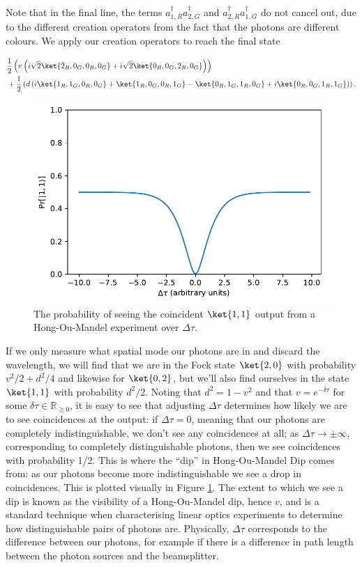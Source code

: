 Note that in the final line, the terms $a_{1,R}^\dagger a_{2,G}^\dagger$ and $a_{2,R}^\dagger a_{1,G}^\dagger$ do not cancel out, due to the different creation operators from the fact that the photons are different colours. We apply our creation operators to reach the final state

\begin{align}
&\frac{1}{2}\left(v\left(i\sqrt{2}\ket{2_R,0_G,0_R,0_G} +i\sqrt{2}\ket{0_R,0_G,2_R,0_G}\right)\right)\nonumber\\
&+\frac{1}{2}\left( d\left(i\ket{1_R,1_G,0_R,0_G} + \ket{1_R,0_G,0_R,1_G} - \ket{0_R,1_G,1_R,0_G}+i\ket{0_R,0_G,1_R,1_G} \right)\right).
\end{align}

\begin{figure}
\begin{center}
\includegraphics[width=0.5\linewidth]{preliminary_bs/hom_plot}
\end{center}
\caption{\label{fig:hom-plot}The probability of seeing the coincident $\ket{1,1}$ output from a Hong-Ou-Mandel experiment over $\Delta\tau$.}
\end{figure}

If we only measure what spatial mode our photons are in and discard the wavelength, we will find that we are in the Fock state $\ket{2,0}$ with probability $v^2/2 + d^2/4$ and likewise for $\ket{0,2}$, but we'll also find ourselves in the state $\ket{1,1}$ with probability $d^2/2$. Noting that $d^2 = 1-v^2$ and that $v=e^{-\delta\tau}$ for some $\delta\tau\in \mathbb{R}_{\geq 0}$, it is easy to see that adjusting $\Delta\tau$ determines how likely we are to see coincidences at the output: if $\Delta\tau=0$, meaning that our photons are completely indistinguishable, we don't see any coincidences at all; as $\Delta\tau\rightarrow\pm\infty$, corresponding to completely distinguishable photons, then we see coincidences with probability 1/2. This is where the ``dip'' in Hong-Ou-Mandel Dip comes from: as our photons become more indistinguishable we see a drop in coincidences. This is plotted visually in Figure \ref{fig:hom-plot}. The extent to which we see a dip is known as the visibility of a Hong-Ou-Mandel dip, hence $v$, and is a standard technique when characterising linear optics experiments to determine how distinguishable pairs of photons are. Physically, $\Delta\tau$ corresponds to the difference between our photons, for example if there is a difference in path length between the photon sources and the beamsplitter.

